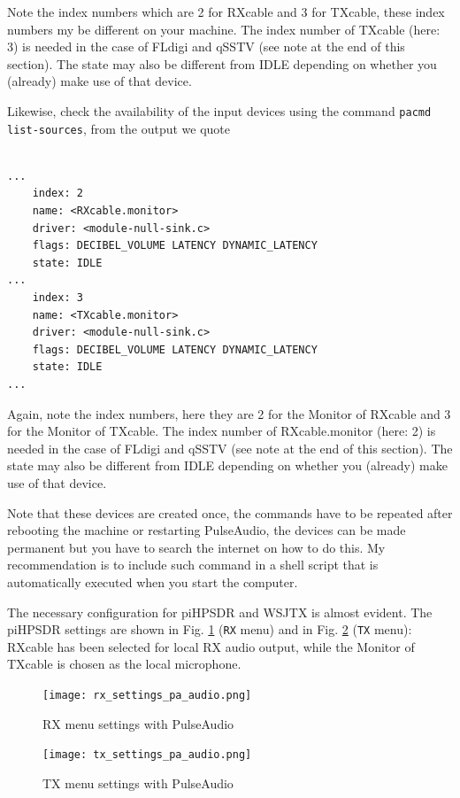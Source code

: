 \documentclass[12pt]{book}
\def\bltt#1{\texttt{\color{blue}#1}}
\def\pH{pi\-HPSDR\xspace}
\begin{document}
Note the index numbers which are 2 for RXcable and 3 for TXcable, these index numbers my
be different on your machine. The index number of TXcable (here: 3) is needed in the
case of FLdigi and qSSTV (see note at the end of this section).
The state may also be different from IDLE depending on whether
you (already) make use of that device.

Likewise, check the availability of the input devices using
the command \texttt{pacmd list-sources}, from the output we quote

\begin{small}
\begin{verbatim}

...
    index: 2
	name: <RXcable.monitor>
	driver: <module-null-sink.c>
	flags: DECIBEL_VOLUME LATENCY DYNAMIC_LATENCY
	state: IDLE
...
    index: 3
	name: <TXcable.monitor>
	driver: <module-null-sink.c>
	flags: DECIBEL_VOLUME LATENCY DYNAMIC_LATENCY
	state: IDLE
...
\end{verbatim}
\end{small}

Again, note the index numbers, here they are 2 for the Monitor of RXcable and 3 for the Monitor
of TXcable. The index number of RXcable.monitor (here: 2) is needed in the
case of FLdigi and qSSTV (see note at the end of this section).
The state may also be different from IDLE depending on whether
you (already) make use of that device.

Note that these devices are created once, the commands have to be repeated after rebooting
the machine or restarting PulseAudio, the devices can be made permanent but you have to
search the internet on how to do this. My recommendation is to include such command in a
shell script that is automatically executed when you start the computer.

The necessary configuration for \pH and WSJTX is  almost evident. The
\pH settings are shown in Fig. \ref{fig:rx_settings_pa_audio} (\bltt{RX} menu)
and in Fig. \ref{fig:tx_settings_pa_audio} (\bltt{TX} menu): RXcable has been selected
for local RX audio output, while the Monitor of TXcable is chosen as the local
microphone.

\begin{figure}[ht]
\center
\texttt{[image: rx\_settings\_pa\_audio.png]}
\caption{RX menu settings with PulseAudio}
\label{fig:rx_settings_pa_audio}
\end{figure}

\begin{figure}[ht]
\label{fig:pa2}
\center
\texttt{[image: tx\_settings\_pa\_audio.png]}
\caption{TX menu settings with PulseAudio}
\label{fig:tx_settings_pa_audio}
\end{figure}
\end{document}

